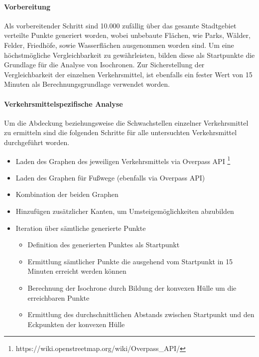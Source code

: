 \paragraph*{Vorbereitung}
\label{vorbereitung}

Als vorbereitender Schritt sind 10.000 zufällig über das gesamte Stadtgebiet verteilte Punkte generiert worden, wobei unbebaute Flächen, wie Parks, Wälder, Felder, Friedhöfe, sowie Wasserflächen ausgenommen worden sind. Um eine höchstmögliche Vergleichbarkeit zu gewährleisten, bilden diese als Startpunkte die Grundlage für die Analyse von Isochronen. Zur Sicherstellung der Vergleichbarkeit der einzelnen Verkehrsmittel, ist ebenfalls ein fester Wert von 15 Minuten als Berechnungsgrundlage verwendet worden.

\paragraph*{Verkehrsmittelspezifische Analyse}
\label{verkehrsmittelspezifische_analyse}

Um die Abdeckung beziehungsweise die Schwachstellen einzelner Verkehrsmittel zu ermitteln sind die folgenden Schritte für alle untersuchten Verkehrsmittel durchgeführt worden.

\begin{itemize}
    \item Laden des Graphen des jeweiligen Verkehrsmittels via Overpass API \footnote{https://wiki.openstreetmap.org/wiki/Overpass\_API/}
    \item Laden des Graphen für Fußwege (ebenfalls via Overpass API)
    \item Kombination der beiden Graphen
    \item Hinzufügen zusätzlicher Kanten, um Umsteigemöglichkeiten abzubilden
    \item Iteration über sämtliche generierte Punkte

    \begin{itemize}
        \item Definition des generierten Punktes als Startpunkt
        \item Ermittlung sämtlicher Punkte die ausgehend vom Startpunkt in 15 Minuten erreicht werden können
        \item Berechnung der Isochrone durch Bildung der konvexen Hülle um die erreichbaren Punkte
        \item Ermittlung des durchschnittlichen Abstands zwischen Startpunkt und den Eckpunkten der konvexen Hülle
    \end{itemize}

\end{itemize}

